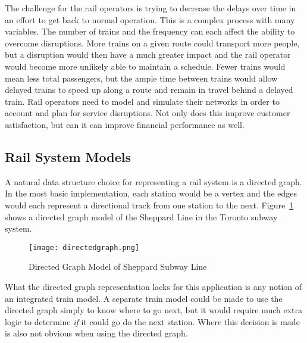 The challenge for the rail operators is trying to decrease the delays over time
in an effort to get back to normal operation.  This is a complex process with
many variables.  The number of trains and the frequency can each affect the
ability to overcome disruptions.  More trains on a given route could transport
more people, but a disruption would then have a much greater impact and the rail
operator would become more unlikely able to maintain a schedule.  Fewer trains
would mean less total passengers, but the ample time between trains would allow
delayed trains to speed up along a route and remain in travel behind a delayed
train. Rail operators need to model and simulate their networks in order to
account and plan for service disruptions.  Not only does this improve customer
satisfaction, but can it can improve financial performance as well.

\subsection{Rail System Models}

A natural data structure choice for representing a rail system is a directed
graph.  In the most basic implementation, each station would be a vertex and the
edges would each represent a directional track from one station to the next.
Figure~\ref{fig:directedgraph} shows a directed graph model of the Sheppard Line
in the Toronto subway system.

\begin{figure}[htb]
	\centering
	\texttt{[image: directedgraph.png]}
	\caption{Directed Graph Model of Sheppard Subway Line}\label{fig:directedgraph}
\end{figure}

What the directed graph representation lacks for this application is any notion
of an integrated train model. A separate train model could be made to use the
directed graph simply to know where to go next, but it would require much extra
logic to determine \textit{if} it could go do the next station.  Where this
decision is made is also not obvious when using the directed graph.

